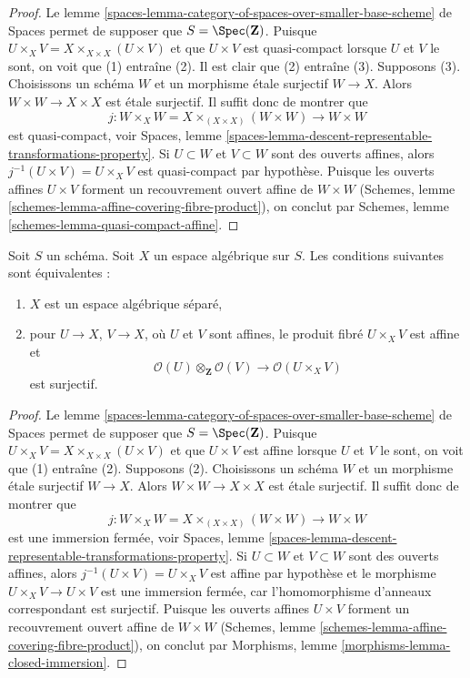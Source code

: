 \begin{proof}
Le lemme
\ref{spaces-lemma-category-of-spaces-over-smaller-base-scheme}
de Spaces permet de supposer que $S = \Spec(\mathbf{Z})$.
Puisque $U \times_X V = X \times_{X \times X} (U \times V)$
et que $U \times V$ est quasi-compact lorsque $U$ et $V$ le sont,
on voit que (1) entraîne (2). Il est clair que (2) entraîne (3).
Supposons (3). Choisissons un schéma $W$ et un morphisme étale surjectif
$W \to X$. Alors $W \times W \to X \times X$ est étale surjectif.
Il suffit donc de montrer que
$$
j : W \times_X W = X \times_{(X \times X)} (W \times W) \to W \times W
$$
est quasi-compact, voir Spaces, lemme
\ref{spaces-lemma-descent-representable-transformations-property}.
Si $U \subset W$ et $V \subset W$ sont des ouverts affines, alors
$j^{-1}(U \times V) = U \times_X V$ est quasi-compact par hypothèse.
Puisque les ouverts affines $U \times V$ forment un recouvrement ouvert affine de
$W \times W$ (Schemes, lemme \ref{schemes-lemma-affine-covering-fibre-product}),
on conclut par
Schemes, lemme \ref{schemes-lemma-quasi-compact-affine}.
\end{proof}

\begin{lemma}
\label{lemma-characterize-separated}
Soit $S$ un schéma. Soit $X$ un espace algébrique sur $S$.
Les conditions suivantes sont équivalentes :
\begin{enumerate}
\item $X$ est un espace algébrique séparé,
\item pour $U \to X$, $V \to X$, où $U$ et $V$ sont affines,
le produit fibré $U \times_X V$ est affine et
$$
\mathcal{O}(U) \otimes_\mathbf{Z} \mathcal{O}(V)
\longrightarrow
\mathcal{O}(U \times_X V)
$$
est surjectif.
\end{enumerate}
\end{lemma}

\begin{proof}
Le lemme
\ref{spaces-lemma-category-of-spaces-over-smaller-base-scheme}
de Spaces permet de supposer que $S = \Spec(\mathbf{Z})$.
Puisque $U \times_X V = X \times_{X \times X} (U \times V)$
et que $U \times V$ est affine lorsque $U$ et $V$ le sont,
on voit que (1) entraîne (2).
Supposons (2). Choisissons un schéma $W$ et un morphisme étale surjectif
$W \to X$. Alors $W \times W \to X \times X$ est étale surjectif.
Il suffit donc de montrer que
$$
j : W \times_X W = X \times_{(X \times X)} (W \times W) \to W \times W
$$
est une immersion fermée, voir Spaces, lemme
\ref{spaces-lemma-descent-representable-transformations-property}.
Si $U \subset W$ et $V \subset W$ sont des ouverts affines, alors
$j^{-1}(U \times V) = U \times_X V$ est affine par hypothèse
et le morphisme $U \times_X V \to U \times V$ est une immersion fermée,
car l'homomorphisme d'anneaux correspondant est surjectif.
Puisque les ouverts affines $U \times V$ forment un recouvrement ouvert affine
de $W \times W$
(Schemes, lemme \ref{schemes-lemma-affine-covering-fibre-product}),
on conclut par
Morphisms, lemme \ref{morphisms-lemma-closed-immersion}.
\end{proof}







